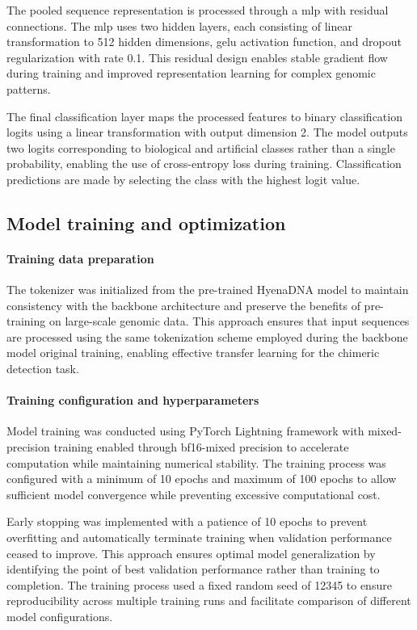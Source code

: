 \documentclass[pdflatex,sn-nature]{sn-jnl}%
\theoremstyle{thmstyleone}%
\theoremstyle{thmstyletwo}%
\theoremstyle{thmstylethree}%
\begin{document}
The pooled sequence representation is processed through a \gls{mlp} with residual connections.
The \gls{mlp} uses two hidden layers, each consisting of linear transformation to 512 hidden dimensions, \gls{gelu} activation function, and dropout regularization with rate 0.1.
This residual design enables stable gradient flow during training and improved representation learning for complex genomic patterns.

The final classification layer maps the processed features to binary classification logits using a linear transformation with output dimension 2.
The model outputs two logits corresponding to biological and artificial classes rather than a single probability, enabling the use of cross-entropy loss during training.
Classification predictions are made by selecting the class with the highest logit value.

\subsection*{Model training and optimization}

\paragraph{Training data preparation}

The tokenizer was initialized from the pre-trained HyenaDNA model to maintain consistency with the backbone architecture and preserve the benefits of pre-training on large-scale genomic data.
This approach ensures that input sequences are processed using the same tokenization scheme employed during the backbone model original training, enabling effective transfer learning for the chimeric detection task.

\paragraph{Training configuration and hyperparameters}

Model training was conducted using PyTorch Lightning framework with mixed-precision training enabled through bf16-mixed precision to accelerate computation while maintaining numerical stability.
The training process was configured with a minimum of 10 epochs and maximum of 100 epochs to allow sufficient model convergence while preventing excessive computational cost.

Early stopping was implemented with a patience of 10 epochs to prevent overfitting and automatically terminate training when validation performance ceased to improve.
This approach ensures optimal model generalization by identifying the point of best validation performance rather than training to completion.
The training process used a fixed random seed of 12345 to ensure reproducibility across multiple training runs and facilitate comparison of different model configurations.
\end{document}
